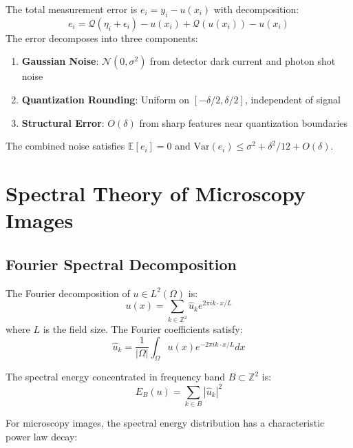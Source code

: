 \documentclass[twocolumn,11pt]{article}
\begin{document}
\begin{theorem}
The total measurement error is $e_i = y_i - u(x_i)$ with decomposition:
\begin{equation}
e_i = \mathcal{Q}(\eta_i + \epsilon_i) - u(x_i) + \mathcal{Q}(u(x_i)) - u(x_i)
\end{equation}
The error decomposes into three components:
\begin{enumerate}
\item \textbf{Gaussian Noise}: $\mathcal{N}(0, \sigma^2)$ from detector dark current and photon shot noise
\item \textbf{Quantization Rounding}: Uniform on $[-\delta/2, \delta/2]$, independent of signal
\item \textbf{Structural Error}: $O(\delta)$ from sharp features near quantization boundaries
\end{enumerate}

The combined noise satisfies $\mathbb{E}[e_i] = 0$ and $\text{Var}(e_i) \leq \sigma^2 + \delta^2/12 + O(\delta)$.
\end{theorem}

\section{Spectral Theory of Microscopy Images}

\subsection{Fourier Spectral Decomposition}

The Fourier decomposition of $u \in L^2(\Omega)$ is:
\begin{equation}
u(x) = \sum_{k \in \mathbb{Z}^2} \hat{u}_k e^{2\pi i k \cdot x / L}
\end{equation}
where $L$ is the field size. The Fourier coefficients satisfy:
\begin{equation}
\hat{u}_k = \frac{1}{|\Omega|} \int_\Omega u(x) e^{-2\pi i k \cdot x / L} dx
\end{equation}

\begin{definition}
The spectral energy concentrated in frequency band $B \subset \mathbb{Z}^2$ is:
\begin{equation}
E_B(u) = \sum_{k \in B} |\hat{u}_k|^2
\end{equation}
\end{definition}

For microscopy images, the spectral energy distribution has a characteristic power law decay:
\end{document}
